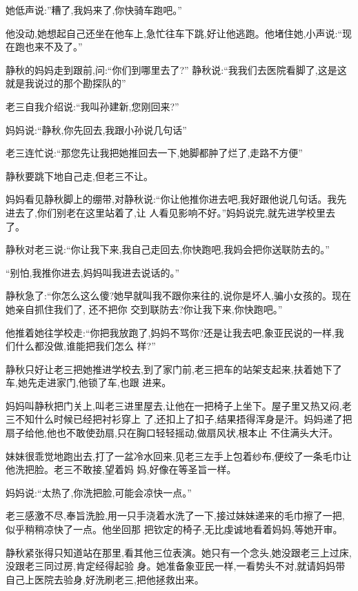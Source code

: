 ﻿\documentclass[12pt]{article}
\begin{document}
她低声说:''糟了,我妈来了,你\myrule 快骑车跑吧。''

他没动,她想起自己还坐在他车上,急忙往车下跳,好让他逃跑。他堵住她,小声说:``现在跑也来不及了。''

静秋的妈妈走到跟前,问:``你们\myrule 到哪里去了?'' 静秋说:``我\myrule 我们去医院看脚了,这是\myrule 这
就是我说过的那个\myrule 勘探队的\myrule ''

老三自我介绍说:``我叫孙建新,您\myrule 刚回来?''

妈妈说:``静秋,你先回去,我跟\myrule 小孙说几句话\myrule ''

老三连忙说:``那您先让我把她推回去一下,她脚都肿了烂了,走路不方便\myrule ''

静秋要跳下地自己走,但老三不让。

妈妈看见静秋脚上的绷带,对静秋说:``你让他推你进去吧,我好跟他说几句话。我先进去了,你们别老在这里站着了,让
人看见影响不好。''妈妈说完,就先进学校里去了。

静秋对老三说:``你\myrule 让我下来,我自己走回去,你快跑吧,我妈会把你送联防去的。''

``别怕,我推你进去,妈妈叫我进去说话的。''

静秋急了:``你怎么这么傻?她早就叫我不跟你来往的,说你是坏人,骗小女孩的。现在她亲自抓住我们了, 还不把你
交到联防去?你让我下来,你快跑吧。''

他推着她往学校走:``你把我放跑了,妈妈不骂你?还是让我去吧,象亚民说的一样,我们什么都没做,谁能把我们怎么
样?''

静秋只好让老三把她推进学校去,到了家门前,老三把车的站架支起来,扶着她下了车,她先走进家门,他锁了车,也跟
进来。



妈妈叫静秋把门关上,叫老三进里屋去,让他在一把椅子上坐下。屋子里又热又闷,老三不知什么时候已经把衬衫穿上
了,还扣上了扣子,结果捂得浑身是汗。妈妈递了把扇子给他,他也不敢使劲扇,只在胸口轻轻摇动,做扇风状,根本止
不住满头大汗。

妹妹很乖觉地跑出去,打了一盆冷水回来,见老三左手上包着纱布,便绞了一条毛巾让他洗把脸。老三不敢接,望着妈
妈,好像在等圣旨一样。

妈妈说:``太热了,你洗把脸,可能会凉快一点。''

老三感激不尽,奉旨洗脸,用一只手浇着水洗了一下,接过妹妹递来的毛巾擦了一把,似乎稍稍凉快了一点。他坐回那
把钦定的椅子,无比虔诚地看着妈妈,等她开审。

静秋紧张得只知道站在那里,看其他三位表演。她只有一个念头,她没跟老三上过床,没跟老三同过房,肯定经得起验
身。她准备象亚民一样,一看势头不对,就请妈妈带自己上医院去验身,好洗刷老三,把他拯救出来。
\end{document}
